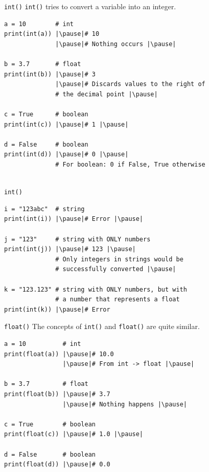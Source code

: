 \documentclass[dvipsnames, svgnames, x11names, handout]{beamer}
\begin{document}
\begin{frame}[fragile]{\texttt{int()}}
\texttt{int()} tries to convert a variable into an integer.
\begin{verbatim} 
a = 10        # int
print(int(a)) |\pause|# 10
			  |\pause|# Nothing occurs |\pause|
			  
b = 3.7       # float
print(int(b)) |\pause|# 3
              |\pause|# Discards values to the right of 
              # the decimal point |\pause|
              
c = True      # boolean
print(int(c)) |\pause|# 1 |\pause|

d = False     # boolean
print(int(d)) |\pause|# 0 |\pause|
              # For boolean: 0 if False, True otherwise
              
\end{verbatim}
\end{frame}

\begin{frame}[fragile]{\texttt{int()}}
\begin{verbatim}
i = "123abc"  # string
print(int(i)) |\pause|# Error |\pause|

j = "123"     # string with ONLY numbers
print(int(j)) |\pause|# 123 |\pause|
              # Only integers in strings would be 
              # successfully converted |\pause|

k = "123.123" # string with ONLY numbers, but with 
              # a number that represents a float
print(int(k)) |\pause|# Error 
\end{verbatim}
\end{frame}

\begin{frame}[fragile]{\texttt{float()}}
The concepts of \texttt{int()} and \texttt{float()} are quite similar. \pause
\begin{verbatim} 
a = 10          # int
print(float(a)) |\pause|# 10.0
                |\pause|# From int -> float |\pause|

b = 3.7         # float
print(float(b)) |\pause|# 3.7
                |\pause|# Nothing happens |\pause|

c = True        # boolean
print(float(c)) |\pause|# 1.0 |\pause|

d = False       # boolean
print(float(d)) |\pause|# 0.0
\end{verbatim}
\end{frame}
\end{document}
